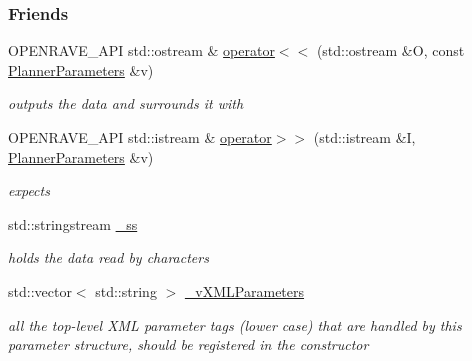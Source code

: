 \subsubsection*{Friends}
\begin{DoxyCompactItemize}
\item 
OPENRAVE\_\-API std::ostream \& \hyperlink{classOpenRAVE_1_1PlannerBase_1_1PlannerParameters_a3a2efece353b49fc6235ec2ded1a7c9f}{operator$<$$<$} (std::ostream \&O, const \hyperlink{classOpenRAVE_1_1PlannerBase_1_1PlannerParameters}{PlannerParameters} \&v)
\begin{DoxyCompactList}\small\item\em outputs the data and surrounds it with \item\end{DoxyCompactList}\item 
OPENRAVE\_\-API std::istream \& \hyperlink{classOpenRAVE_1_1PlannerBase_1_1PlannerParameters_ac5b28f01c1ef45850c2fd44be0b12aea}{operator$>$$>$} (std::istream \&I, \hyperlink{classOpenRAVE_1_1PlannerBase_1_1PlannerParameters}{PlannerParameters} \&v)
\begin{DoxyCompactList}\small\item\em expects \item\end{DoxyCompactList}\end{DoxyCompactItemize}
\label{_amgrpd41d8cd98f00b204e9800998ecf8427e}
 \begin{DoxyCompactItemize}
\item 
\hypertarget{classOpenRAVE_1_1PlannerBase_1_1PlannerParameters_ab4d8dc52e167678ba742d5e74fa8bbd2}{
std::stringstream \hyperlink{classOpenRAVE_1_1PlannerBase_1_1PlannerParameters_ab4d8dc52e167678ba742d5e74fa8bbd2}{\_\-ss}}
\label{classOpenRAVE_1_1PlannerBase_1_1PlannerParameters_ab4d8dc52e167678ba742d5e74fa8bbd2}

\begin{DoxyCompactList}\small\item\em holds the data read by characters \item\end{DoxyCompactList}\item 
\hypertarget{classOpenRAVE_1_1PlannerBase_1_1PlannerParameters_a6bdbb89d87824ee05004fbd5ecd4994b}{
std::vector$<$ std::string $>$ \hyperlink{classOpenRAVE_1_1PlannerBase_1_1PlannerParameters_a6bdbb89d87824ee05004fbd5ecd4994b}{\_\-vXMLParameters}}
\label{classOpenRAVE_1_1PlannerBase_1_1PlannerParameters_a6bdbb89d87824ee05004fbd5ecd4994b}

\begin{DoxyCompactList}\small\item\em all the top-\/level XML parameter tags (lower case) that are handled by this parameter structure, should be registered in the constructor \item\end{DoxyCompactList}\end{DoxyCompactItemize}


